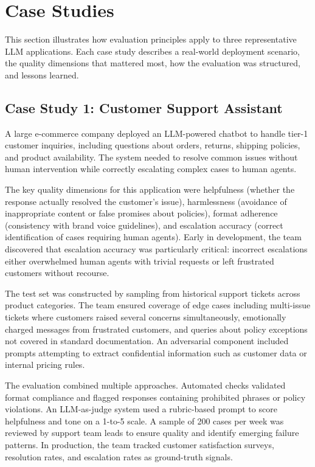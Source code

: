 
\section{Case Studies}
\label{sec:case-studies}

This section illustrates how evaluation principles apply to three representative LLM applications. Each case study describes a real-world deployment scenario, the quality dimensions that mattered most, how the evaluation was structured, and lessons learned.

\subsection{Case Study 1: Customer Support Assistant}

A large e-commerce company deployed an LLM-powered chatbot to handle tier-1 customer inquiries, including questions about orders, returns, shipping policies, and product availability. The system needed to resolve common issues without human intervention while correctly escalating complex cases to human agents.

The key quality dimensions for this application were helpfulness (whether the response actually resolved the customer's issue), harmlessness (avoidance of inappropriate content or false promises about policies), format adherence (consistency with brand voice guidelines), and escalation accuracy (correct identification of cases requiring human agents). Early in development, the team discovered that escalation accuracy was particularly critical: incorrect escalations either overwhelmed human agents with trivial requests or left frustrated customers without recourse.

The test set was constructed by sampling from historical support tickets across product categories. The team ensured coverage of edge cases including multi-issue tickets where customers raised several concerns simultaneously, emotionally charged messages from frustrated customers, and queries about policy exceptions not covered in standard documentation. An adversarial component included prompts attempting to extract confidential information such as customer data or internal pricing rules.

The evaluation combined multiple approaches. Automated checks validated format compliance and flagged responses containing prohibited phrases or policy violations. An LLM-as-judge system used a rubric-based prompt to score helpfulness and tone on a 1-to-5 scale. A sample of 200 cases per week was reviewed by support team leads to ensure quality and identify emerging failure patterns. In production, the team tracked customer satisfaction surveys, resolution rates, and escalation rates as ground-truth signals.

